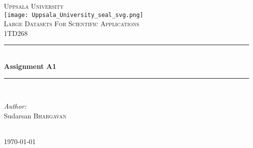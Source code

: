 \documentclass[12pt]{article}
\begin{document}
\begin{titlepage}

\newcommand{\HRule}{\rule{\linewidth}{0.5mm}} %

\center %
 

\textsc{\LARGE Uppsala University}\\[1.5cm] %
\texttt{[image: Uppsala\_University\_seal\_svg.png]}\\[1cm] %
\textsc{\Large Large Datasets For Scientific Applications}\\[0.5cm] %
\textsc{\large 1TD268}\\[0.5cm] %


\HRule \\[0.4cm]
{ \huge \bfseries Assignment A1}\\[0.4cm] %
\HRule \\[1.5cm]
 

\begin{minipage}{0.4\textwidth}
\begin{flushleft} \large
\emph{Author:}\\
Sudarsan \textsc{Bhargavan}\\ %
\end{flushleft}

\end{minipage}\\[2cm]



{\large \today}\\[2cm] %

\vfill %

\end{titlepage}
\end{document}
